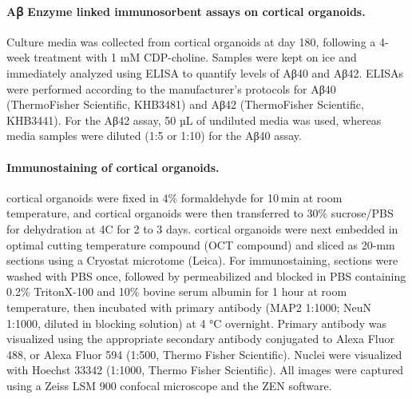 \paragraph{Aꞵ Enzyme linked immunosorbent assays on cortical organoids.}
Culture media was collected from cortical organoids at day 180, following a 4-week treatment with 1 mM CDP-choline. Samples were kept on ice and immediately analyzed using ELISA to quantify levels of Aβ40 and Aβ42. ELISAs were performed according to the manufacturer’s protocols for Aβ40 (ThermoFisher Scientific, KHB3481) and Aβ42 (ThermoFisher Scientific, KHB3441). For the Aβ42 assay, 50 µL of undiluted media was used, whereas media samples were diluted (1:5 or 1:10) for the Aβ40 assay.

\paragraph{Immunostaining of cortical organoids.}
cortical organoids were fixed in 4\% formaldehyde for 10 min at room temperature, and cortical organoids were then transferred to 30\% sucrose/PBS for dehydration at 4C for 2 to 3 days. cortical organoids were next embedded in optimal cutting temperature compound (OCT compound) and sliced as 20-mm sections using a Cryostat microtome (Leica). For immunostaining, sections were washed with PBS once, followed by permeabilized and blocked in PBS containing 0.2\% TritonX-100 and 10\% bovine serum albumin for 1 hour at room temperature, then incubated with primary antibody (MAP2 1:1000; NeuN 1:1000, diluted in blocking solution) at 4 °C overnight. Primary antibody was visualized using the appropriate secondary antibody conjugated to Alexa Fluor 488, or Alexa Fluor 594 (1:500, Thermo Fisher Scientific). Nuclei were visualized with Hoechst 33342 (1:1000, Thermo Fisher Scientific). All images were captured using a Zeiss LSM 900 confocal microscope and the ZEN software. 
